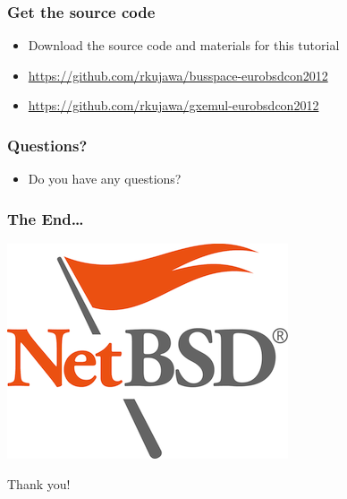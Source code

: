 \documentclass[dvipsnames,table]{beamer}
\begin{document}
\begin{frame}
\frametitle{Get the source code}

\begin{itemize}
	\item Download the source code and materials for this tutorial
	\item {\small\url{https://github.com/rkujawa/busspace-eurobsdcon2012}}
	\item {\small\url{https://github.com/rkujawa/gxemul-eurobsdcon2012}}
\end{itemize}
\end{frame}


\begin{frame}
\frametitle{Questions?}

\begin{itemize}
	\item Do you have any questions?
\end{itemize}
\end{frame}

\begin{frame}
\frametitle{The End\ldots}
\vspace*{-0.8cm}
\begin{center}
\includegraphics[scale=0.5]{NetBSD.png}

Thank you!
\end{center}
\end{frame}

 
\end{document}
